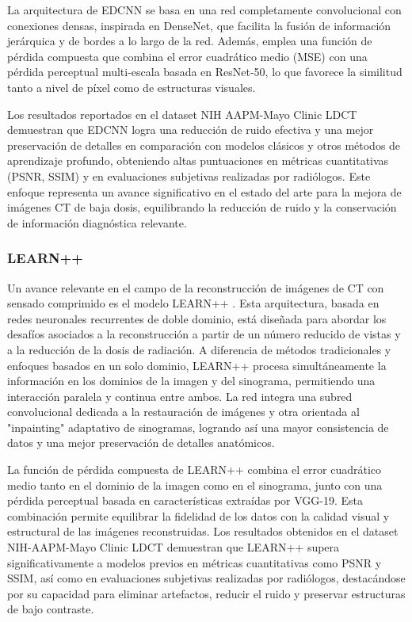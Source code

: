 La arquitectura de EDCNN se basa en una red completamente convolucional con conexiones densas, inspirada en DenseNet, que facilita la fusión de información jerárquica y de bordes a lo largo de la red. Además, emplea una función de pérdida compuesta que combina el error cuadrático medio (MSE) con una pérdida perceptual multi-escala basada en ResNet-50, lo que favorece la similitud tanto a nivel de píxel como de estructuras visuales. 

Los resultados reportados en el dataset NIH AAPM-Mayo Clinic LDCT demuestran que EDCNN logra una reducción de ruido efectiva y una mejor preservación de detalles en comparación con modelos clásicos y otros métodos de aprendizaje profundo, obteniendo altas puntuaciones en métricas cuantitativas (PSNR, SSIM) y en evaluaciones subjetivas realizadas por radiólogos. Este enfoque representa un avance significativo en el estado del arte para la mejora de imágenes CT de baja dosis, equilibrando la reducción de ruido y la conservación de información diagnóstica relevante.

\subsubsection{LEARN++}

Un avance relevante en el campo de la reconstrucción de imágenes de CT con sensado comprimido es el modelo LEARN++ \cite{LEARN++}. Esta arquitectura, basada en redes neuronales recurrentes de doble dominio, está diseñada para abordar los desafíos asociados a la reconstrucción a partir de un número reducido de vistas y a la reducción de la dosis de radiación. A diferencia de métodos tradicionales y enfoques basados en un solo dominio, LEARN++ procesa simultáneamente la información en los dominios de la imagen y del sinograma, permitiendo una interacción paralela y continua entre ambos. La red integra una subred convolucional dedicada a la restauración de imágenes y otra orientada al "inpainting" adaptativo de sinogramas, logrando así una mayor consistencia de datos y una mejor preservación de detalles anatómicos.

La función de pérdida compuesta de LEARN++ combina el error cuadrático medio tanto en el dominio de la imagen como en el sinograma, junto con una pérdida perceptual basada en características extraídas por VGG-19. Esta combinación permite equilibrar la fidelidad de los datos con la calidad visual y estructural de las imágenes reconstruidas. Los resultados obtenidos en el dataset NIH-AAPM-Mayo Clinic LDCT demuestran que LEARN++ supera significativamente a modelos previos en métricas cuantitativas como PSNR y SSIM, así como en evaluaciones subjetivas realizadas por radiólogos, destacándose por su capacidad para eliminar artefactos, reducir el ruido y preservar estructuras de bajo contraste.


